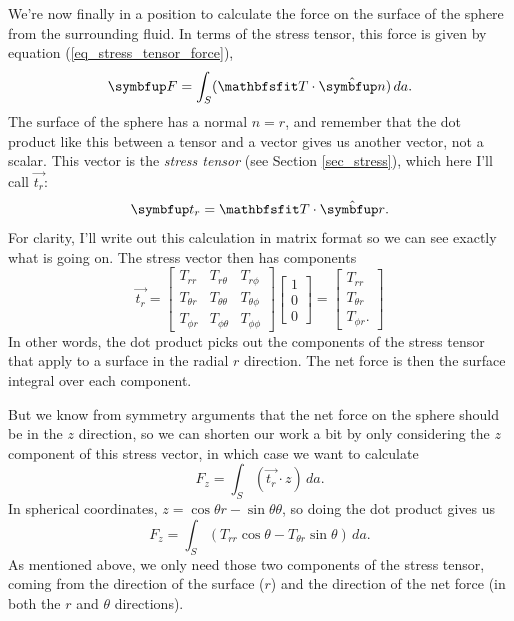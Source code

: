 We're now finally in a position to calculate the force on the surface of the sphere from the surrounding fluid.  In terms of the stress tensor, this force is given by equation (\ref{eq_stress_tensor_force}),
\[
\vec{F} = \int_S (\tens{T} \cdot \unit{n} ) \, da.
\]
The surface of the sphere has a normal $\unit{n} = \unit{r}$, and remember that the dot product like this between a tensor and a vector gives us another vector, not a scalar.  This vector is the \emph{stress tensor} (see Section \ref{sec_stress}), which here I'll call $\vec{t_r}$:
\[
\vec{t_r} = \tens{T} \cdot \unit{r}.
\]
For clarity, I'll write out this calculation in matrix format so we can see exactly what is going on.  The stress vector then has components
\[
\vec{t_r} = \begin{bmatrix}
T_{rr} & T_{r\theta} & T_{r\phi} \\
T_{\theta r} & T_{\theta \theta} & T_{\theta \phi} \\
T_{\phi r} & T_{\phi \theta} & T_{\phi \phi} 
\end{bmatrix}
\begin{bmatrix}
1 \\
0 \\
0
\end{bmatrix} = \begin{bmatrix}
T_{rr} \\
T_{\theta r} \\
T_{\phi r}.
\end{bmatrix}
\]
In other words, the dot product picks out the components of the stress tensor that apply to a surface in the radial $\unit{r}$ direction.  The net force is then the surface integral over each component.

But we know from symmetry arguments that the net force on the sphere should be in the $z$ direction, so we can shorten our work a bit by only considering the $z$ component of this stress vector, in which case we want to calculate
\[
F_z = \int_S (\vec{t_r} \cdot \unit{z} ) \, da.
\]
In spherical coordinates, $\unit{z} = \cos\theta \unit{r} - \sin\theta \unit{\theta}$, so doing the dot product gives us
\[
F_z = \int_S ( T_{rr} \cos \theta - T_{\theta r} \sin \theta ) \, da.
\]
As mentioned above, we only need those two components of the stress tensor, coming from the direction of the surface ($\unit{r}$) and the direction of the net force (in both the $\unit{r}$ and $\unit{\theta}$ directions).

